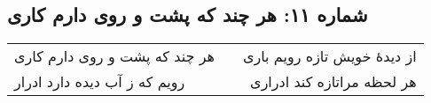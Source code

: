 \begin{center}
\section*{شماره ۱۱: هر چند که پشت و روی دارم کاری}
\label{sec:011}
\begin{longtable}{l p{0.5cm} r}
هر چند که پشت و روی دارم کاری
&&
از دیدهٔ خویش تازه رویم باری
\\
رویم که ز آب دیده دارد ادرار
&&
هر لحظه مراتازه کند ادراری
\\
\end{longtable}
\end{center}

